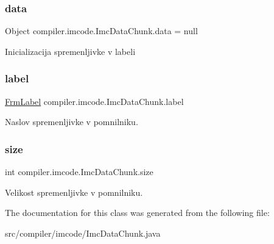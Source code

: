 \subsubsection{\texorpdfstring{data}{data}}
{\footnotesize\ttfamily Object compiler.\+imcode.\+Imc\+Data\+Chunk.\+data = null}

Inicializacija spremenljivke v labeli \mbox{\label{classcompiler_1_1imcode_1_1_imc_data_chunk_ae3bdb3450a2c71be9415b349d165af3e}} 
\subsubsection{\texorpdfstring{label}{label}}
{\footnotesize\ttfamily \hyperlink{classcompiler_1_1frames_1_1_frm_label}{Frm\+Label} compiler.\+imcode.\+Imc\+Data\+Chunk.\+label}

Naslov spremenljivke v pomnilniku. \mbox{\label{classcompiler_1_1imcode_1_1_imc_data_chunk_ad580e546fbdbc7446f513ef1647ffe97}} 
\subsubsection{\texorpdfstring{size}{size}}
{\footnotesize\ttfamily int compiler.\+imcode.\+Imc\+Data\+Chunk.\+size}

Velikost spremenljivke v pomnilniku. 

The documentation for this class was generated from the following file\+:\begin{DoxyCompactItemize}
\item 
src/compiler/imcode/Imc\+Data\+Chunk.\+java\end{DoxyCompactItemize}
